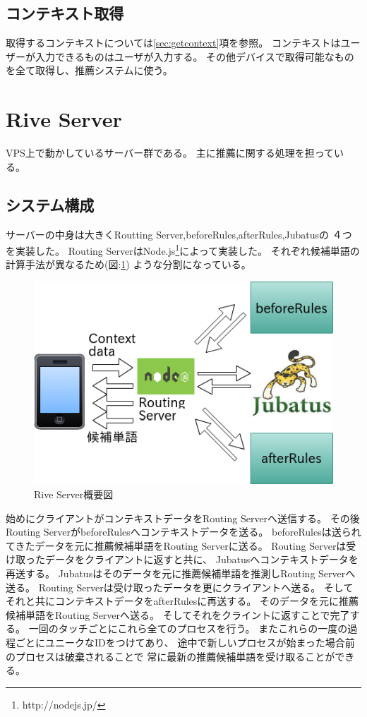 \subsection{コンテキスト取得}
取得するコンテキストについては\ref{sec:getcontext}項を参照。
コンテキストはユーザーが入力できるものはユーザが入力する。
その他デバイスで取得可能なものを全て取得し、推薦システムに使う。

\section{Rive Server}
\label{sec:riveserver}
VPS上で動かしているサーバー群である。
主に推薦に関する処理を担っている。

\subsection{システム構成}
サーバーの中身は大きくRoutting Server,beforeRules,afterRules,Jubatusの
４つを実装した。
Routing ServerはNode.js\footnote{http://nodejs.jp/}によって実装した。
それぞれ候補単語の計算手法が異なるため(図:\ref{fig:riveserver})
ような分割になっている。
\begin{figure}[htbp]
  \begin{center}
    \includegraphics[width=14cm,bb=0 0 466 316]{images/riveserver.png}
  \end{center}
  \caption{Rive Server概要図}
  \label{fig:riveserver}
\end{figure}
始めにクライアントがコンテキストデータをRouting Serverへ送信する。
その後Routing ServerがbeforeRulesへコンテキストデータを送る。
beforeRulesは送られてきたデータを元に推薦候補単語をRouting Serverに送る。
Routing Serverは受け取ったデータをクライアントに返すと共に、
Jubatusへコンテキストデータを再送する。
Jubatusはそのデータを元に推薦候補単語を推測しRouting Serverへ送る。
Routing Serverは受け取ったデータを更にクライアントへ送る。
そしてそれと共にコンテキストデータをafterRulesに再送する。
そのデータを元に推薦候補単語をRouting Serverへ送る。
そしてそれをクライントに返すことで完了する。
一回のタッチごとにこれら全てのプロセスを行う。
またこれらの一度の過程ごとにユニークなIDをつけてあり、
途中で新しいプロセスが始まった場合前のプロセスは破棄されることで
常に最新の推薦候補単語を受け取ることができる。

